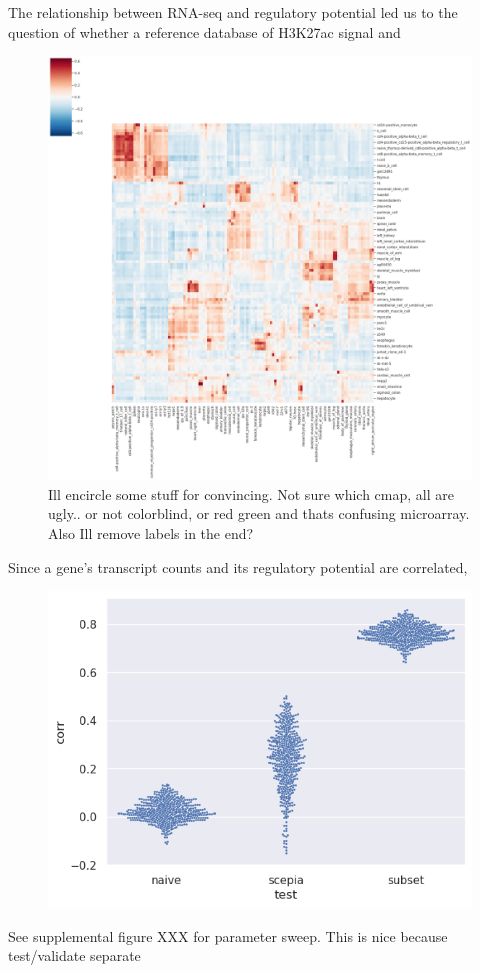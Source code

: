 The relationship between RNA-seq and regulatory potential led us to the question of whether a reference database of H3K27ac signal and 

\begin{figure}
    \centering
    \includegraphics[width=0.75\linewidth]{ch.scepia/imgs/celltypes.png}
    \caption{Ill encircle some stuff for convincing. Not sure which cmap, all are ugly.. or not colorblind, or red green and thats confusing microarray. Also Ill remove labels in the end?}
    \label{fig:celltypes}
\end{figure}
Since a gene's transcript counts and its regulatory potential are correlated, 
\begin{figure}
    \centering
    \includegraphics[width=0.75\linewidth]{ch.scepia/imgs/scepia_bulk_benchmark.png}
    \caption{}
    \label{fig:enter-label}
\end{figure}
See supplemental figure XXX for parameter sweep. This is nice because test/validate separate

